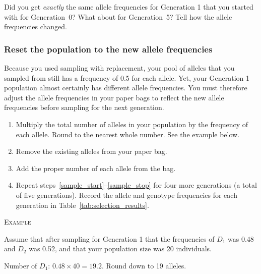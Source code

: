 \documentclass[12pt]{exam}
\newcommand{\allele}[1]{$#1$}
\begin{document}
\begin{questions}
	
	\question
	Did you get \emph{exactly} the same allele frequencies for
	Generation 1 that you started with for Generation~0? What about for Generation~5? Tell how the allele frequencies changed. 
	
	\vspace*{6\baselineskip}
	
\subsubsection*{Reset the population to the new allele frequencies}

Because you used sampling with replacement, your pool of alleles that you sampled from still has a frequency of 0.5 for each 
allele. Yet, your Generation 1 population almost certainly has 
different allele frequencies.  You must therefore adjust the
allele frequencies in your paper bags to reflect the new allele 
frequencies before sampling for the next generation.

\begin{enumerate} [resume]

	\item Multiply the total number of alleles in your population by the frequency of each allele. Round to the nearest whole number. See the example below.
	
	\item Remove the existing alleles from your paper bag.
	
	\item \label{sample_stop} Add the proper number of each allele from the bag.
	
	\item Repeat steps~\ref{sample_start}–\ref{sample_stop} for four more generations (a total of five generations). Record the allele and genotype frequencies for each generation in Table~\ref{tab:selection_results}. %
	
\end{enumerate} 

	\medskip
	
	\textsc{Example} 
	
	Assume that after sampling for Generation 1 that the frequencies of \allele{D_1} was 0.48 and \allele{D_2} was 0.52, and that your population size was 20 individuals.
	
	Number of \allele{D_1}: $0.48 \times 40 = 19.2.$ Round down to 19 alleles.
	

\end{questions}
\end{document}
